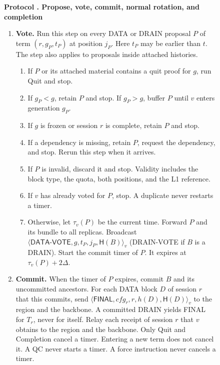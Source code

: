 \documentclass[11pt,a4paper]{article}
\newcommand{\RR}[1]{{\color{rrRed}#1}}
\newcommand{\Hash}{\mathsf H}
\newcommand{\tagg}[1]{\ensuremath{\mathsf{#1}}}
\newcounter{protocol}
\newenvironment{protocol}[2]{\begin{figure}[htbp]\refstepcounter{protocol}\label{#1}
\begin{mdframed}[linewidth=.6pt,skipabove=0pt,skipbelow=0pt,
innertopmargin=7pt,innerbottommargin=7pt]\small
\textbf{Protocol \theprotocol. #2}\par\smallskip}{\end{mdframed}\end{figure}}
\begin{document}
\begin{protocol}{alg:steady}{Propose, vote, commit, normal rotation\RR{, and completion}}
\begin{enumerate}[label=\textbf{\arabic*)},itemsep=3pt]
\item \textbf{Vote.} Run this step on every DATA \RR{or DRAIN} proposal
$P$ of term $(r,g_P,t_P)$ at position $j_P$. Here $t_P$ may be earlier
than $t$. The step also applies to proposals inside attached histories.
 \begin{enumerate}[label=(\alph*)]
 \item If $P$ or its attached material contains a quit proof for $g$,
       run Quit and stop.
 \item If $g_P<g$, retain $P$ and stop. If $g_P>g$, buffer $P$
       until $v$ enters generation $g_P$.
 \item If $g$ is frozen \RR{or session $r$ is complete}, retain $P$ and
       stop.
 \item If a dependency is missing, retain $P$, request the dependency,
       and stop. Rerun this step when it arrives.
 \item If $P$ is invalid, discard it and stop. \RR{Validity includes the
       block type, the quota, both positions, and the L1 reference.}
 \item If $v$ has already voted for $P$, stop.
       A duplicate never restarts a timer.
 \item Otherwise, let $\tau_v(P)$ be the current time. Forward $P$ and
       its bundle to all replicas. Broadcast
       $\langle\tagg{DATA\mbox{-}VOTE},g,t_P,j_P,\Hash(B)\rangle_v$
       \RR{(DRAIN-VOTE if $B$ is a DRAIN)}.
       Start the commit timer of $P$. It expires at $\tau_v(P)+2\Delta$.
 \end{enumerate}

\item \textbf{Commit.} When the timer of $P$ expires, commit $B$ and
its uncommitted ancestors. \RR{For each DATA block $D$ of session $r$
that this commits, send
$\langle\tagg{FINAL},\mathit{cfg}_r,r,h(D),\Hash(D)\rangle_v$ to the region
and the backbone. A committed DRAIN yields FINAL for $T_r$, never for
itself. Relay each receipt of session $r$ that $v$ obtains to the region
and the backbone.} Only Quit \RR{and Completion} cancel a timer. Entering a
new term does not cancel it. A QC never starts a timer. \RR{A force
instruction never cancels a timer.}


\end{enumerate}
\end{protocol}
\end{document}
